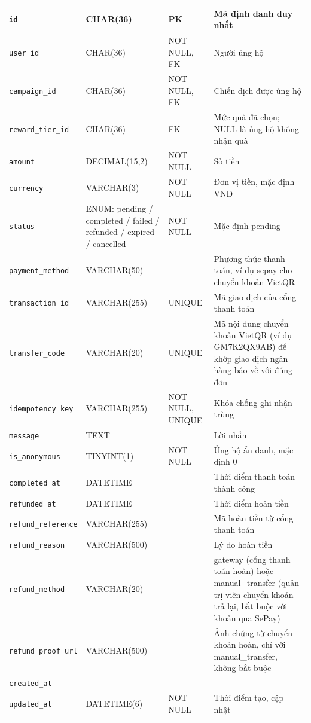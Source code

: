{\begin{longtable}{|P{3.2cm}|P{2.8cm}|P{2.2cm}|p{5.4cm}|}
    \texttt{id} & CHAR(36) & PK & Mã định danh duy nhất \\
    \hline
    \texttt{user\_\allowbreak{}id} & CHAR(36) & NOT NULL, FK & Người ủng hộ \\
    \hline
    \texttt{campaign\_\allowbreak{}id} & CHAR(36) & NOT NULL, FK & Chiến dịch được ủng hộ \\
    \hline
    \texttt{reward\_\allowbreak{}tier\_\allowbreak{}id} & CHAR(36) & FK & Mức quà đã chọn; NULL là ủng hộ không nhận quà \\
    \hline
    \texttt{amount} & DECIMAL(15,2) & NOT NULL & Số tiền \\
    \hline
    \texttt{currency} & VARCHAR(3) & NOT NULL & Đơn vị tiền, mặc định VND \\
    \hline
    \texttt{status} & ENUM: pending / completed / failed / refunded / expired / cancelled & NOT NULL & Mặc định pending \\
    \hline
    \texttt{payment\_\allowbreak{}method} & VARCHAR(50) &  & Phương thức thanh toán, ví dụ sepay cho chuyển khoản VietQR \\
    \hline
    \texttt{transaction\_\allowbreak{}id} & VARCHAR(255) & UNIQUE & Mã giao dịch của cổng thanh toán \\
    \hline
    \texttt{transfer\_\allowbreak{}code} & VARCHAR(20) & UNIQUE & Mã nội dung chuyển khoản VietQR (ví dụ GM7K2QX9AB) để khớp giao dịch ngân hàng báo về với đúng đơn \\
    \hline
    \texttt{idempotency\_\allowbreak{}key} & VARCHAR(255) & NOT NULL, UNIQUE & Khóa chống ghi nhận trùng \\
    \hline
    \texttt{message} & TEXT &  & Lời nhắn \\
    \hline
    \texttt{is\_\allowbreak{}anonymous} & TINYINT(1) & NOT NULL & Ủng hộ ẩn danh, mặc định 0 \\
    \hline
    \texttt{completed\_\allowbreak{}at} & DATETIME &  & Thời điểm thanh toán thành công \\
    \hline
    \texttt{refunded\_\allowbreak{}at} & DATETIME &  & Thời điểm hoàn tiền \\
    \hline
    \texttt{refund\_\allowbreak{}reference} & VARCHAR(255) &  & Mã hoàn tiền từ cổng thanh toán \\
    \hline
    \texttt{refund\_\allowbreak{}reason} & VARCHAR(500) &  & Lý do hoàn tiền \\
    \hline
    \texttt{refund\_\allowbreak{}method} & VARCHAR(20) &  & gateway (cổng thanh toán hoàn) hoặc manual\_\allowbreak{}transfer (quản trị viên chuyển khoản trả lại, bắt buộc với khoản qua SePay) \\
    \hline
    \texttt{refund\_\allowbreak{}proof\_\allowbreak{}url} & VARCHAR(500) &  & Ảnh chứng từ chuyển khoản hoàn, chỉ với manual\_\allowbreak{}transfer, không bắt buộc \\
    \hline
    \texttt{created\_\allowbreak{}at} &  &  &  \\
    \hline
    \texttt{updated\_\allowbreak{}at} & DATETIME(6) & NOT NULL & Thời điểm tạo, cập nhật \\
    \hline
\end{longtable}
}

